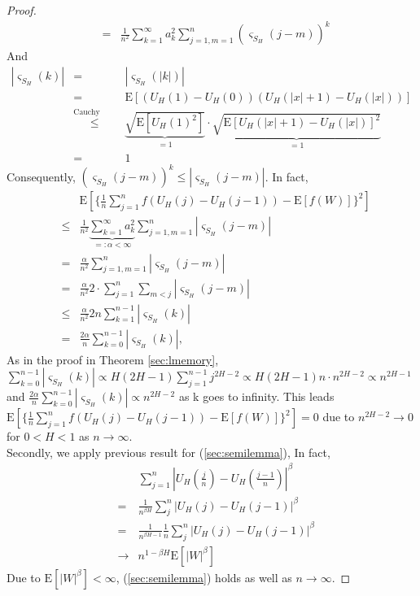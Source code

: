 \documentclass[a4paper, twoside, 11pt]{article}
\theoremstyle{definition}
\begin{document}
\begin{proof}
\begin{eqnarray*}
	&=& \frac{1}{n^2} \sum\limits_{k=1}^\infty a_k^2\sum\limits_{j=1, m=1}^n (\varsigma_{S_H}(j-m))^k
  \end{eqnarray*}
	And
	\begin{eqnarray*}
	  |\varsigma_{S_H}(k)| &=& |\varsigma_{S_H}(|k|)|\\
	  &=& \mathrm{E}[(U_H(1) - U_H(0))(U_H(|x|+1)-U_H(|x|))]\\
	  &\overset{\text{Cauchy Schwartz}}{\le}& \underbrace{\sqrt{\mathrm{E}[U_H(1)^2]}}_{= 1}\cdot \underbrace{\sqrt{\mathrm{E}[U_H(|x|+1) - U_H(|x|)]^2}}_{= 1}\\
	  &=& 1
	\end{eqnarray*}
	Consequently, $(\varsigma_{S_H}(j-m))^k \le |\varsigma_{S_H}(j-m)|$. In fact,
	\begin{eqnarray*}
	  && \mathrm{E}[\{\frac{1}{n}\sum\limits_{j=1}^n f(U_H(j) - U_H(j-1)) - \mathrm{E}[f(W)]\}^2]\\
	  &\le& \frac{1}{n^2} \underbrace{\sum\limits_{k=1}^\infty a_k^2}_{=:\alpha < \infty}\sum\limits_{j=1, m=1}^n |\varsigma_{S_H}(j-m)|\\
	  &=& \frac{\alpha}{n^2} \sum\limits_{j=1, m=1}^n |\varsigma_{S_H}(j-m)|\\
	  &=& \frac{\alpha}{n^2} 2 \cdot \sum\limits_{j=1}^n  \sum\limits_{m<j} |\varsigma_{S_H}(j-m)|\\
	  &\le& \frac{\alpha}{n^2} 2n \sum\limits_{k=1}^{n-1} |\varsigma_{S_H}(k)|\\
	  &=& \frac{2\alpha}{n}  \sum\limits_{k=0}^{n-1} |\varsigma_{S_H}(k)|,
	\end{eqnarray*}
	As in the proof in Theorem \ref{sec:lmemory}, $\sum\limits_{k=0}^{n-1} |\varsigma_{S_H}(k)| \propto H(2H-1)\sum\limits_{j=1}^{n-1}j^{2H-2} \propto H(2H-1)n\cdot n^{2H-2} \propto n^{2H-1}$ and $\frac{2\alpha}{n} \sum\limits_{k=0}^{n-1} |\varsigma_{S_H}(k)| \propto n^{2H-2}$ as k goes to infinity. This leads  $\mathrm{E}[\{\frac{1}{n}\sum\limits_{j=1}^n f(U_H(j) - U_H(j-1)) - \mathrm{E}[f(W)]\}^2]=0$ due to $n^{2H-2}\rightarrow 0$ for $0<H<1$ as $n \rightarrow \infty$.\\
	Secondly, we apply previous result for (\ref{sec:semilemma}), In fact,
	\begin{eqnarray*}
		&&\sum_{j=1}^n |U_H(\frac{j}{n}) - U_H(\frac{j-1}{n})|^\beta\\
		&=& \frac{1}{n^{\beta H}} \sum_{j}^n|U_H(j) - U_H(j-1)|^\beta\\
		&=& \frac{1}{n^{\beta H-1}} \frac{1}{n}\sum_{j}^n|U_H(j) - U_H(j-1)|^\beta\\
		&\longrightarrow& n^{1-\beta H}\mathrm{E}[|W|^\beta]
	  \end{eqnarray*}
	  Due to $\mathrm{E}[|W|^\beta] < \infty$, (\ref{sec:semilemma}) holds as well as $n\rightarrow \infty$.
\end{proof}
\end{document}
